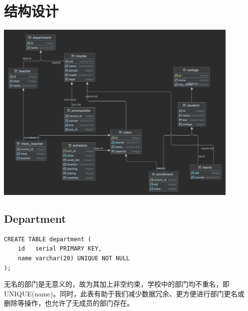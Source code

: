 \section{结构设计}
\vspace{1em}
\centerline{\includegraphics[width=0.9\textwidth]{./pic/ddl.png}}

\subsection{Department}
\begin{lstlisting}
CREATE TABLE department (
    id   serial PRIMARY KEY,
    name varchar(20) UNIQUE NOT NULL
);
\end{lstlisting}
\vspace{-3em}\par
无名的部门是无意义的，故为其加上非空约束，学校中的部门均不重名，即UNIQUE(name)。同时，此表有助于我们减少数据冗余、更方便进行部门更名或删除等操作，也允许了无成员的部门存在。


